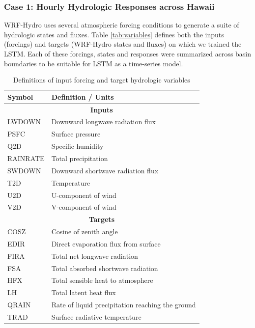 \documentclass{article}
\begin{document}
\subsubsection{Case 1: Hourly Hydrologic Responses across Hawaii}
\label{sec:cs1}

WRF-Hydro uses several atmospheric forcing conditions to generate a suite of hydrologic states and fluxes. Table \ref{tab:variables} defines both the inputs (forcings) and targets (WRF-Hydro states and fluxes) on which we trained the LSTM. Each of these forcings, states and responses were summarized across basin boundaries to be suitable for LSTM as a time-series model.

\begin{table}[ht]
\label{tab:variables}
  \centering
  \caption{Definitions of input forcing and target hydrologic variables}
  \label{tab:var_defs}
  \begin{tabular}{|l|p{10cm}|}
    \hline
    \textbf{Symbol} & \textbf{Definition / Units} \\
    \hline
    \multicolumn{2}{|c|}{\textbf{Inputs}} \\
    \hline
    LWDOWN   & Downward longwave radiation flux \\
    PSFC     & Surface pressure \\
    Q2D      & Specific humidity \\
    RAINRATE & Total precipitation \\
    SWDOWN   & Downward shortwave radiation flux \\
    T2D      & Temperature \\
    U2D      & U-component of wind \\
    V2D      & V-component of wind \\
    \hline
    \multicolumn{2}{|c|}{\textbf{Targets}} \\
    \hline
    COSZ     & Cosine of zenith angle \\
    EDIR     & Direct evaporation flux from surface \\
    FIRA     & Total net longwave radiation \\
    FSA      & Total absorbed shortwave radiation \\
    HFX      & Total sensible heat to atmosphere \\
    LH       & Total latent heat flux \\
    QRAIN    & Rate of liquid precipitation reaching the ground \\
    TRAD     & Surface radiative temperature \\
    \hline
  \end{tabular}
\end{table}
\end{document}
